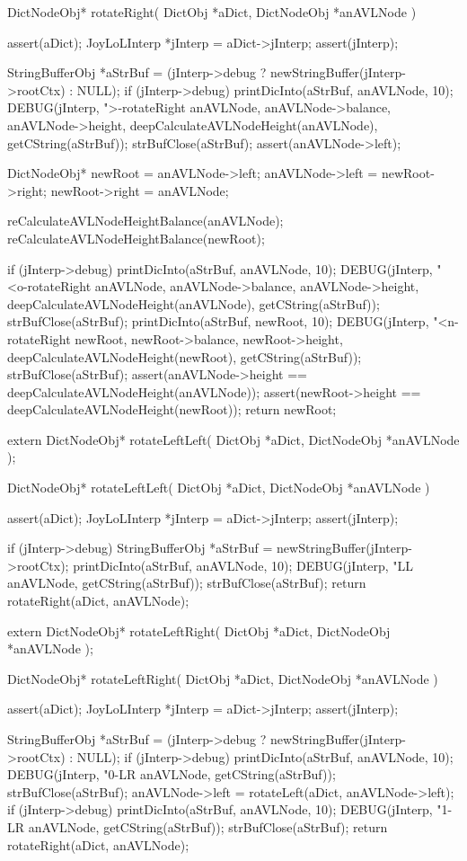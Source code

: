 \startCCode
DictNodeObj* rotateRight(
  DictObj     *aDict,
  DictNodeObj *anAVLNode
) {
  assert(aDict);
  JoyLoLInterp *jInterp = aDict->jInterp;
  assert(jInterp);
  
  StringBufferObj *aStrBuf =
    (jInterp->debug ? newStringBuffer(jInterp->rootCtx) : NULL);
  if (jInterp->debug) {
    printDicInto(aStrBuf, anAVLNode, 10);
    DEBUG(jInterp, ">-rotateRight %
          anAVLNode, anAVLNode->balance, anAVLNode->height,
          deepCalculateAVLNodeHeight(anAVLNode),
          getCString(aStrBuf));
    strBufClose(aStrBuf);
  }
  assert(anAVLNode->left);

  DictNodeObj* newRoot = anAVLNode->left;
  anAVLNode->left = newRoot->right;
  newRoot->right  = anAVLNode;

  reCalculateAVLNodeHeightBalance(anAVLNode);
  reCalculateAVLNodeHeightBalance(newRoot);

  if (jInterp->debug) {
    printDicInto(aStrBuf, anAVLNode, 10);
    DEBUG(jInterp, "<o-rotateRight %
          anAVLNode, anAVLNode->balance, anAVLNode->height,
          deepCalculateAVLNodeHeight(anAVLNode),
          getCString(aStrBuf));
    strBufClose(aStrBuf);
    printDicInto(aStrBuf, newRoot, 10);
    DEBUG(jInterp, "<n-rotateRight %
          newRoot, newRoot->balance, newRoot->height,
          deepCalculateAVLNodeHeight(newRoot),
          getCString(aStrBuf));
    strBufClose(aStrBuf);
  }
  assert(anAVLNode->height == deepCalculateAVLNodeHeight(anAVLNode));
  assert(newRoot->height == deepCalculateAVLNodeHeight(newRoot));
  return newRoot;
}
\stopCCode

\startCHeader
extern DictNodeObj* rotateLeftLeft(
  DictObj     *aDict,
  DictNodeObj *anAVLNode
);
\stopCHeader

\startCCode
DictNodeObj* rotateLeftLeft(
  DictObj     *aDict,
  DictNodeObj *anAVLNode
) {
  assert(aDict);
  JoyLoLInterp *jInterp = aDict->jInterp;
  assert(jInterp);
  
  if (jInterp->debug) {
    StringBufferObj *aStrBuf = newStringBuffer(jInterp->rootCtx);
    printDicInto(aStrBuf, anAVLNode, 10);
    DEBUG(jInterp, "LL %
      anAVLNode, getCString(aStrBuf));
    strBufClose(aStrBuf);
  }
  return rotateRight(aDict, anAVLNode);
}
\stopCCode

\startCHeader
extern DictNodeObj* rotateLeftRight(
  DictObj     *aDict,
  DictNodeObj *anAVLNode
);
\stopCHeader

\startCCode
DictNodeObj* rotateLeftRight(
  DictObj     *aDict,
  DictNodeObj *anAVLNode
) {
  assert(aDict);
  JoyLoLInterp *jInterp = aDict->jInterp;
  assert(jInterp);
  
  StringBufferObj *aStrBuf =
    (jInterp->debug ? newStringBuffer(jInterp->rootCtx) : NULL);
  if (jInterp->debug) {
    printDicInto(aStrBuf, anAVLNode, 10);
    DEBUG(jInterp, "0-LR %
      anAVLNode, getCString(aStrBuf));
    strBufClose(aStrBuf);
  }
  anAVLNode->left = rotateLeft(aDict, anAVLNode->left);
  if (jInterp->debug) {
    printDicInto(aStrBuf, anAVLNode, 10);
    DEBUG(jInterp, "1-LR %
      anAVLNode, getCString(aStrBuf));
    strBufClose(aStrBuf);
  }
  return rotateRight(aDict, anAVLNode);
}
\stopCCode

